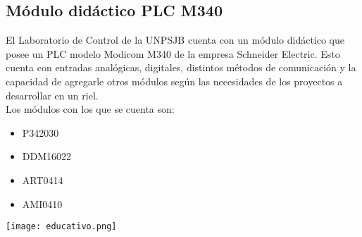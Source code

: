 

\subsection{Módulo didáctico PLC M340} \label{sec:didac}

El Laboratorio de Control de la UNPSJB cuenta con un módulo didáctico que posee un PLC modelo Modicom M340 de la empresa Schneider Electric. Esto cuenta con entradas analógicas, digitales, distintos métodos de comunicación y la capacidad de agregarle otros módulos según las necesidades de los proyectos a desarrollar en un riel.  \\
Los módulos con los que se cuenta son:
\begin{itemize}
	\item P342030
	\item DDM16022
	\item ART0414
	\item AMI0410 
	
\end{itemize}
\begin{center}
	\texttt{[image: educativo.png]}
	\label{fig:didac}
\end{center}





